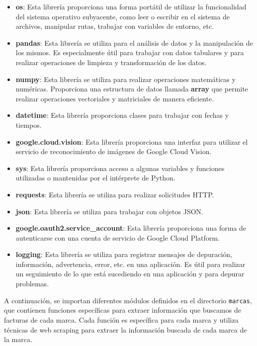\documentclass{article}
\begin{document}
\begin{itemize}
    \item \textbf{os}: Esta librería proporciona una forma portátil de utilizar la funcionalidad del sistema operativo subyacente, como leer o escribir en el sistema de archivos, manipular rutas, trabajar con variables de entorno, etc.
    \item \textbf{pandas}: Esta librería se utiliza para el análisis de datos y la manipulación de los mismos. Es especialmente útil para trabajar con datos tabulares y para realizar operaciones de limpieza y transformación de los datos.
    \item \textbf{numpy}: Esta librería se utiliza para realizar operaciones matemáticas y numéricas. Proporciona una estructura de datos llamada \textbf{array} que permite realizar operaciones vectoriales y matriciales de manera eficiente.
    \item \textbf{datetime}: Esta librería proporciona clases para trabajar con fechas y tiempos.
    \item \textbf{google.cloud.vision}: Esta librería proporciona una interfaz para utilizar el servicio de reconocimiento de imágenes de Google Cloud Vision.
    \item \textbf{sys}: Esta librería proporciona acceso a algunas variables y funciones utilizadas o mantenidas por el intérprete de Python.
    \item \textbf{requests}: Esta librería se utiliza para realizar solicitudes HTTP.
    \item \textbf{json}: Esta librería se utiliza para trabajar con objetos JSON.
    \item \textbf{google.oauth2.service\_account}: Esta librería proporciona una forma de autenticarse con una cuenta de servicio de Google Cloud Platform.
    \item \textbf{logging}: Esta librería se utiliza para registrar mensajes de depuración, información, advertencia, error, etc. en una aplicación. Es útil para realizar un seguimiento de lo que está sucediendo en una aplicación y para depurar problemas.
\end{itemize}
A continuación, se importan diferentes módulos definidos en el directorio \texttt{marcas}, que contienen funciones específicas para extraer información que buscamos de facturas de cada marca. Cada función es específica para cada marca y utiliza técnicas de web scraping para extraer la información buscada de cada marca de la marca.
\end{document}
